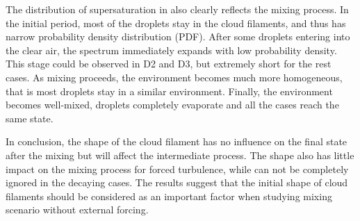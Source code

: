 The distribution of supersaturation in  also clearly
reflects the mixing process. In the initial period, most of the droplets stay
in the cloud filaments, and thus has narrow probability density distribution
(PDF). After some droplets entering into the clear air, the spectrum
immediately expands with low probability density. This stage could be observed
in D2 and D3, but extremely short for the rest cases. As mixing proceeds, the
environment becomes much more homogeneous, that is most droplets stay in a
similar environment. Finally, the environment becomes well-mixed, droplets
completely evaporate and all the cases reach the same state. 

In conclusion, the shape of the cloud
filament has no influence on the final state after the mixing but will affect
the intermediate process. The shape also has little impact on the mixing
process for forced turbulence, while can not be completely ignored in the
decaying cases. The results suggest that the initial shape of cloud filaments
should be considered as an important factor when studying mixing scenario
without external forcing.

